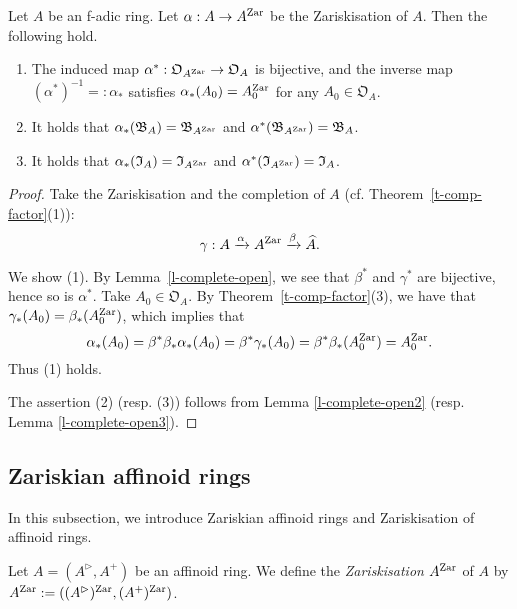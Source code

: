 \begin{cor}\label{c-zar-bdd-open}
Let $A$ be an f-adic ring. 
Let $\alpha:A \to A^{{\operatorname{Zar}}}$ be the Zariskisation of $A$. 
Then the following hold. 
\begin{enumerate}
\item 
The induced map $\alpha^*:\mathfrak O_{A^{{\operatorname{Zar}}}} \to \mathfrak O_{A}$ is bijective, and the inverse map $(\alpha^*)^{-1}=:\alpha_*$ satisfies $\alpha_*(A_0)=A_0^{{\operatorname{Zar}}}$ for any $A_0 \in \mathfrak O_{A}$. 
\item 
It holds that 
$\alpha_*(\mathfrak B_A)=\mathfrak B_{A^{{\operatorname{Zar}}}}$ 
and 
$\alpha^*(\mathfrak B_{A^{{\operatorname{Zar}}}})=\mathfrak B_{A}$. 
\item 
It holds that 
$\alpha_*(\mathfrak I_{A})=\mathfrak I_{A^{{\operatorname{Zar}}}}$ 
and 
$\alpha^*(\mathfrak I_{A^{{\operatorname{Zar}}}})=\mathfrak I_{A}$. 
\end{enumerate}
\end{cor}

\begin{proof}
Take the Zariskisation and the completion of $A$ (cf. Theorem~\ref{t-comp-factor}(1)): 
$$\gamma:A \xrightarrow{\alpha} A^{{\operatorname{Zar}}} \xrightarrow{\beta} \widehat{A}.$$

We show (1).   
By Lemma~\ref{l-complete-open}, 
we see that $\beta^*$ and $\gamma^*$ are bijective, hence so is $\alpha^*$. 
Take $A_0 \in \mathfrak O_{A}$. 
By Theorem~\ref{t-comp-factor}(3), 
we have that $\gamma_*(A_0)=\beta_*(A_0^{{\operatorname{Zar}}})$, 
which implies that 
$$\alpha_*(A_0)=\beta^*\beta_*\alpha_*(A_0)=\beta^*\gamma_*(A_0)=\beta^*\beta_*(A_0^{{\operatorname{Zar}}})=A_0^{{\operatorname{Zar}}}.$$
Thus (1) holds. 



The assertion (2) (resp. (3)) follows from Lemma \ref{l-complete-open2} 
(resp. Lemma \ref{l-complete-open3}). 
\end{proof}





\subsection{Zariskian affinoid rings}\label{ss-zar-aff}

In this subsection, 
we introduce Zariskian affinoid rings and Zariskisation of affinoid rings. 

\begin{dfn}\label{d-zar-affinoid}
Let $A=(A^{\rhd}, A^+)$ be an affinoid ring. 
We define the {\em Zariskisation} $A^{{\operatorname{Zar}}}$ of $A$ 
by $A^{{\operatorname{Zar}}}:=((A^{\rhd})^{{\operatorname{Zar}}}, (A^+)^{{\operatorname{Zar}}})$. 
\end{dfn}

